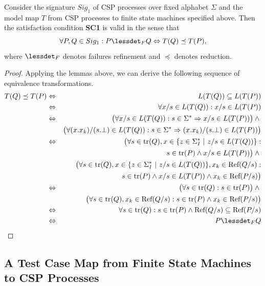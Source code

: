 \begin{theorem}
\label{th:sc1}
Consider the signature $Sig_1$ of CSP processes over fixed alphabet $\Sigma$ and the 
model map $T$ from CSP processes to finite state machines specified above.
Then the satisfaction condition {\bf SC1} is valid in the sense that
$$
\forall P, Q\in Sig_1: P \lessdet_F Q \Leftrightarrow   T(Q) \preceq T(P),
$$
where $\lessdet_F$ denotes failures refinement and $\preceq$ denotes reduction.
\end{theorem}
\begin{proof}
Applying the lemmas above, we can derive the following sequence of equivalence
transformations.
\begin{eqnarray*}
T(Q)\preceq T(P) &\Leftrightarrow & L(T(Q))\subseteq L(T(P))
\\ &\Leftrightarrow &
\forall x/s\in L(T(Q)):   x/s\in  L(T(P))
\\ &\Leftrightarrow &  
\big(\forall x/s\in L(T(Q)): s\in\Sigma^* \Rightarrow x/s\in L(T(P)) \big) \wedge {}
\\ & & 
\big( \forall (x.x_k)/(s.\bot)\in L(T(Q)):  s\in\Sigma^* \Rightarrow 
(x.x_k)/(s.\bot)\in L(T(P)) \big)
\\ &\Leftrightarrow &  
\big(\forall s\in\text{tr}(Q), x\in\{ z\in\Sigma_I^*~|~z/s\in L(T(Q)) \}:
\\ & & \tabc
s\in\text{tr}(P) \wedge x/s\in L(T(P))
\big) \wedge {}
\\ & & 
\big(\forall s\in\text{tr}(Q), x\in\{ z\in\Sigma_I^*~|~z/s\in L(T(Q)) \}, 
x_k\in\text{Ref}(Q/s):
\\ & & \tabc
s\in\text{tr}(P) \wedge x/s\in L(T(P)) \wedge x_k\in\text{Ref}(P/s)
\big)
\\ &\Leftrightarrow &  
\big(\forall s\in\text{tr}(Q): s \in \text{tr}(P)\big) \wedge {}
\\ & & \big(\forall s\in\text{tr}(Q), x_k\in\text{Ref}(Q/s): 
s\in\text{tr}(P) \wedge x_k\in\text{Ref}(P/s)\big)
\\ &\Leftrightarrow &  
\forall s\in {\text {\rm tr}}(Q):   s\in{\text {\rm tr}}(P) \wedge {\text {\rm Ref}}(Q/s)\subseteq {\text {\rm Ref}}(P/s)
\\ &\Leftrightarrow & P \lessdet_F Q
\end{eqnarray*} 
\xbox
\end{proof}
 

\subsection{A Test Case Map from Finite State Machines to CSP Processes}
\label{sec:tcmap}

